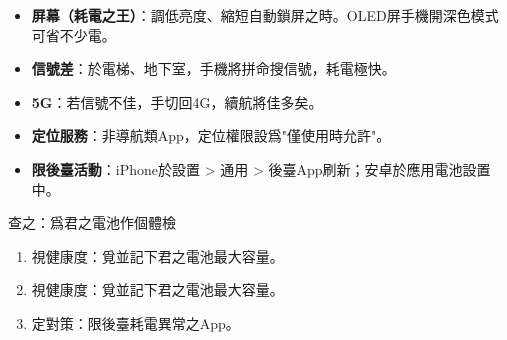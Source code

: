 
\begin{itemize}
  \item \textbf{屏幕（耗電之王）}：調低亮度、縮短自動鎖屏之時。OLED屏手機開深色模式可省不少電。
  \item \textbf{信號差}：於電梯、地下室，手機將拼命搜信號，耗電極快。
  \item \textbf{5G}：若信號不佳，手切回4G，續航將佳多矣。
  \item \textbf{定位服務}：非導航類App，定位權限設爲"僅使用時允許"。
  \item \textbf{限後臺活動}：iPhone於設置 > 通用 > 後臺App刷新；安卓於應用電池設置中。
\end{itemize}

\begin{tcbpractice}{查之：爲君之電池作個體檢}
\begin{enumerate}
  \item 視健康度：覓並記下君之電池最大容量。
  \item 視健康度：覓並記下君之電池最大容量。
  \item 定對策：限後臺耗電異常之App。
\end{enumerate}

\end{tcbpractice}
